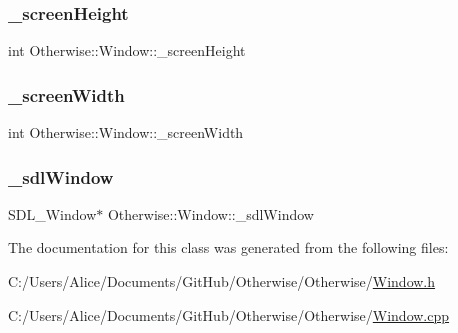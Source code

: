 \subsubsection{\texorpdfstring{\+\_\+screen\+Height}{\_screenHeight}}
{\footnotesize\ttfamily int Otherwise\+::\+Window\+::\+\_\+screen\+Height\hspace{0.3cm}{\ttfamily [private]}}

\mbox{\label{class_otherwise_1_1_window_ac08523329656084bc64eb3d73e80cdf3}} 
\subsubsection{\texorpdfstring{\+\_\+screen\+Width}{\_screenWidth}}
{\footnotesize\ttfamily int Otherwise\+::\+Window\+::\+\_\+screen\+Width\hspace{0.3cm}{\ttfamily [private]}}

\mbox{\label{class_otherwise_1_1_window_a3666189208b2c94d5093b5ac659f51e1}} 
\subsubsection{\texorpdfstring{\+\_\+sdl\+Window}{\_sdlWindow}}
{\footnotesize\ttfamily S\+D\+L\+\_\+\+Window$\ast$ Otherwise\+::\+Window\+::\+\_\+sdl\+Window\hspace{0.3cm}{\ttfamily [private]}}



The documentation for this class was generated from the following files\+:\begin{DoxyCompactItemize}
\item 
C\+:/\+Users/\+Alice/\+Documents/\+Git\+Hub/\+Otherwise/\+Otherwise/\hyperlink{_window_8h}{Window.\+h}\item 
C\+:/\+Users/\+Alice/\+Documents/\+Git\+Hub/\+Otherwise/\+Otherwise/\hyperlink{_window_8cpp}{Window.\+cpp}\end{DoxyCompactItemize}
